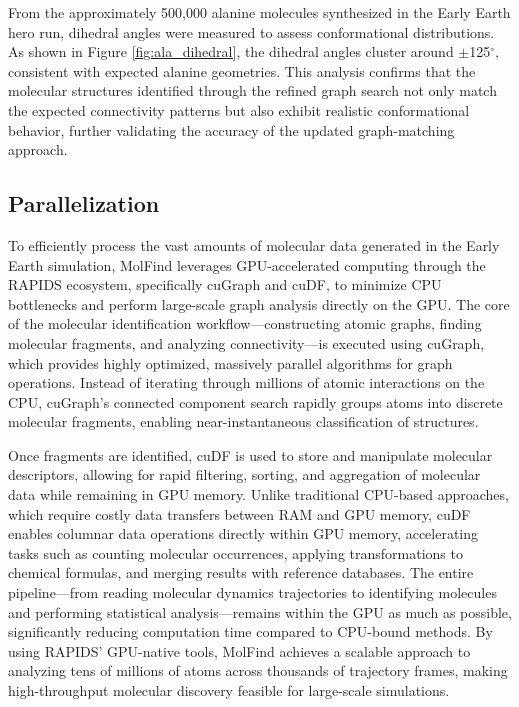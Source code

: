From the approximately 500,000 alanine molecules synthesized in the Early Earth hero run, dihedral angles were measured to assess conformational distributions. As shown in Figure \ref{fig:ala_dihedral}, the dihedral angles cluster around $\pm$125$^\circ$, consistent with expected alanine geometries. This analysis confirms that the molecular structures identified through the refined graph search not only match the expected connectivity patterns but also exhibit realistic conformational behavior, further validating the accuracy of the updated graph-matching approach.

\subsection{Parallelization}
\label{subsec:molfind_parallelization}

To efficiently process the vast amounts of molecular data generated in the Early Earth simulation, MolFind leverages GPU-accelerated computing through the RAPIDS ecosystem, specifically cuGraph and cuDF, to minimize CPU bottlenecks and perform large-scale graph analysis directly on the GPU. The core of the molecular identification workflow—constructing atomic graphs, finding molecular fragments, and analyzing connectivity—is executed using cuGraph, which provides highly optimized, massively parallel algorithms for graph operations. Instead of iterating through millions of atomic interactions on the CPU, cuGraph’s connected component search rapidly groups atoms into discrete molecular fragments, enabling near-instantaneous classification of structures.

Once fragments are identified, cuDF is used  to store and manipulate molecular descriptors, allowing for rapid filtering, sorting, and aggregation of molecular data while remaining in GPU memory. Unlike traditional CPU-based approaches, which require costly data transfers between RAM and GPU memory, cuDF enables columnar data operations directly within GPU memory, accelerating tasks such as counting molecular occurrences, applying transformations to chemical formulas, and merging results with reference databases. The entire pipeline—from reading molecular dynamics trajectories to identifying molecules and performing statistical analysis—remains within the GPU as much as possible, significantly reducing computation time compared to CPU-bound methods. By using RAPIDS' GPU-native tools, MolFind achieves a scalable approach to analyzing tens of millions of atoms across thousands of trajectory frames, making high-throughput molecular discovery feasible for large-scale simulations.




